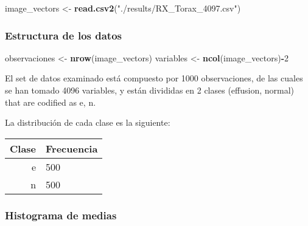 \documentclass[]{article}
\newenvironment{Shaded}{\begin{snugshade}}{\end{snugshade}}
\newcommand{\KeywordTok}[1]{\textcolor[rgb]{0.13,0.29,0.53}{\textbf{#1}}}
\newcommand{\DataTypeTok}[1]{\textcolor[rgb]{0.13,0.29,0.53}{#1}}
\newcommand{\DecValTok}[1]{\textcolor[rgb]{0.00,0.00,0.81}{#1}}
\newcommand{\StringTok}[1]{\textcolor[rgb]{0.31,0.60,0.02}{#1}}
\newcommand{\OperatorTok}[1]{\textcolor[rgb]{0.81,0.36,0.00}{\textbf{#1}}}
\newcommand{\NormalTok}[1]{#1}
\begin{document}
\begin{Shaded}
\begin{Highlighting}[]
\NormalTok{image_vectors <-}\StringTok{ }\KeywordTok{read.csv2}\NormalTok{(}\StringTok{"./results/RX_Torax_4097.csv"}\NormalTok{)}
\end{Highlighting}
\end{Shaded}

\subsubsection{Estructura de los datos}\label{estructura-de-los-datos}

\begin{Shaded}
\begin{Highlighting}[]
\NormalTok{observaciones <-}\StringTok{ }\KeywordTok{nrow}\NormalTok{(image_vectors)}
\NormalTok{variables <-}\StringTok{ }\KeywordTok{ncol}\NormalTok{(image_vectors)}\OperatorTok{-}\DecValTok{2}
\end{Highlighting}
\end{Shaded}

El set de datos examinado está compuesto por 1000 observaciones, de las
cuales se han tomado 4096 variables, y están divididas en 2 clases
(effusion, normal) that are codified as e, n.

La distribución de cada clase es la siguiente:

\begin{Shaded}
\end{Shaded}

\begin{longtable}[]{@{}rl@{}}
\toprule
Clase & Frecuencia\tabularnewline
\midrule
\endhead
e & 500\tabularnewline
n & 500\tabularnewline
\bottomrule
\end{longtable}

\subsubsection{Histograma de medias}\label{histograma-de-medias}
\end{document}
